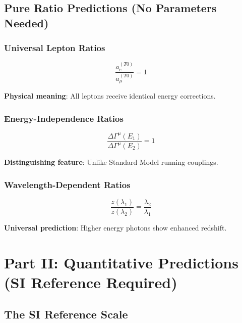 \documentclass[12pt,a4paper]{article}
\theoremstyle{definition}
\theoremstyle{remark}
\begin{document}
	\subsection{Pure Ratio Predictions (No Parameters Needed)}
	
	\subsubsection{Universal Lepton Ratios}
	
	\begin{equation}
		\boxed{\frac{a_e^{(T0)}}{a_{\mu}^{(T0)}} = 1}
		\label{eq:universal_lepton_ratio}
	\end{equation}
	
	\textbf{Physical meaning}: All leptons receive identical energy corrections.
	
	\subsubsection{Energy-Independence Ratios}
	
	\begin{equation}
		\boxed{\frac{\Delta\Gamma^{\mu}(E_1)}{\Delta\Gamma^{\mu}(E_2)} = 1}
		\label{eq:energy_independence_ratio}
	\end{equation}
	
	\textbf{Distinguishing feature}: Unlike Standard Model running couplings.
	
	\subsubsection{Wavelength-Dependent Ratios}
	
	\begin{equation}
		\boxed{\frac{z(\lambda_1)}{z(\lambda_2)} = \frac{\lambda_2}{\lambda_1}}
		\label{eq:wavelength_ratio}
	\end{equation}
	
	\textbf{Universal prediction}: Higher energy photons show enhanced redshift.
	
	\section{Part II: Quantitative Predictions (SI Reference Required)}
	
	\subsection{The SI Reference Scale}
	
\end{document}
